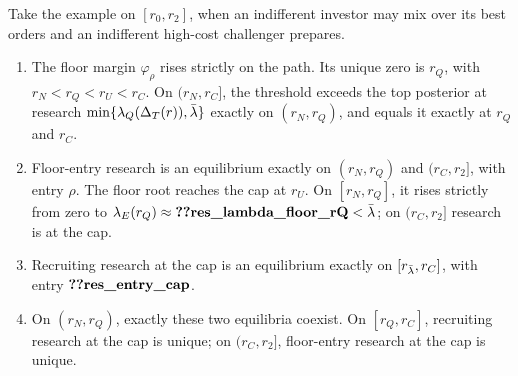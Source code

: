 \begin{lemma}\label{lem:a5-floor}
Take the example on \([r_0,r_2]\), when an indifferent investor may mix over its best orders and an indifferent
high-cost challenger prepares.
\begin{enumerate}[label=(\alph*),leftmargin=2em]
\item The floor margin \(\varphi_\rho\) rises strictly on the path. Its unique zero is \(r_Q\), with
\(r_N<r_Q<r_U<r_C\). On \((r_N,r_C]\), the threshold exceeds the top posterior at research
\(\min\{\lambda_Q(\Delta_T(r)),\bar\lambda\}\) exactly on \((r_N,r_Q)\), and equals it exactly at \(r_Q\) and \(r_C\).
\item Floor-entry research is an equilibrium exactly on \((r_N,r_Q)\) and \((r_C,r_2]\), with entry \(\rho\).
The floor root reaches the cap at \(r_U\). On \([r_N,r_Q]\), it rises strictly from zero to
\(\lambda_E(r_Q)\approx\reg{res_lambda_floor_rQ}<\lb\); on \((r_C,r_2]\) research is at the cap.
\item Recruiting research at the cap is an equilibrium exactly on \([r_{\bar\lambda},r_C]\), with entry
\(\reg{res_entry_cap}\).
\item On \((r_N,r_Q)\), exactly these two equilibria coexist. On \([r_Q,r_C]\), recruiting research at the cap
is unique; on \((r_C,r_2]\), floor-entry research at the cap is unique.
\end{enumerate}
\end{lemma}

